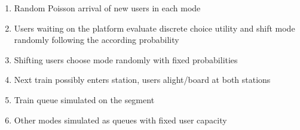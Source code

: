{\begin{enumerate}
	\item Random Poisson arrival of new users in each mode
	\item Users waiting on the platform evaluate discrete choice utility and shift mode randomly following the according probability
	\item Shifting users choose mode randomly with fixed probabilities
	\item Next train possibly enters station, users alight/board at both stations
	\item Train queue simulated on the segment
	\item Other modes simulated as queues with fixed user capacity
\end{enumerate}






}



